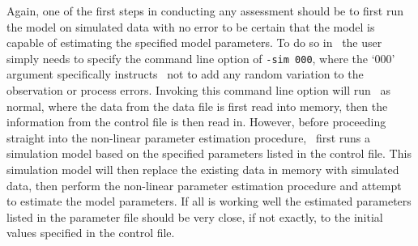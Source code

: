 \begin{multicols}{2}
Again, one of the first steps in conducting any assessment should be to first run the model on simulated data with no error to be certain that the model is capable of estimating the specified model parameters.  To do so in \iscam\, the user simply needs to specify the command line option of \texttt{-sim 000}, where the `000' argument specifically instructs \iscam\ not to add any random variation to the observation or process errors.  Invoking this command line option will run \iscam\ as normal, where the data from the data file is first read into memory, then the information from the control file is then read in.  However, before proceeding straight into the non-linear parameter estimation procedure, \iscam\ first runs a simulation model based on the specified parameters listed in the control file.  This simulation model will then replace the existing data in memory with simulated data, then perform the non-linear parameter estimation procedure and attempt to estimate the model parameters.  If all is working well the estimated parameters listed in the parameter file should be very close, if not exactly, to the initial values specified in the control file.




\end{multicols}
